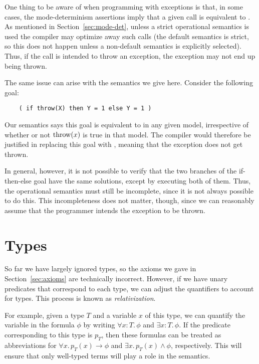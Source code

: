One thing to be aware of when programming with exceptions
is that, in some cases,
the mode-determinism assertions imply
that a given call is equivalent to \true.
As mentioned in Section~\ref{sec:mode-det},
unless a strict operational semantics is used
the compiler may optimize away such calls
(the default semantics is strict,
so this does not happen unless
a non-default semantics is explicitly selected).
Thus, if the call is intended to throw an exception,
the exception may not end up being thrown.

The same issue can arise with the semantics we give here.
Consider the following goal:
\begin{verbatim}
    ( if throw(X) then Y = 1 else Y = 1 )
\end{verbatim}
Our semantics says this goal is equivalent to 
in any given model,
irrespective of whether or not $\operatorname{throw}(x)$
is true in that model.
The compiler would therefore be justified
in replacing this goal with ,
meaning that the exception does not get thrown.

In general, however,
it is not possible to verify that the two branches
of the if-then-else goal have the same solutions,
except by executing both of them.
Thus, the operational semantics must still be incomplete,
since it is not always possible to do this.
This incompleteness does not matter, though,
since we can reasonably assume that
the programmer intends the exception to be thrown.


\section{Types}
\label{sec:types}

So far we have largely ignored types,
so the axioms we gave in Section~\ref{sec:axioms}
are technically incorrect.
However,
if we have unary predicates that correspond to each type,
we can adjust the quantifiers to account for types.
This process is known as \emph{relativization\label{gi:relativization}}.

For example,
given a type $T$
and a variable $x$ of this type,
we can quantify the variable in the formula $\phi$
by writing $\forall x\!:\!T.\, \phi$ and $\exists x\!:\!T.\, \phi$.
If the predicate corresponding to this type is $p_T$,
then these formulas can be treated as abbreviations for
$\forall x.\, p_T(x) \rightarrow \phi$ and
$\exists x.\, p_T(x) \land \phi$,
respectively.
This will ensure that only well-typed terms
will play a role in the semantics.
